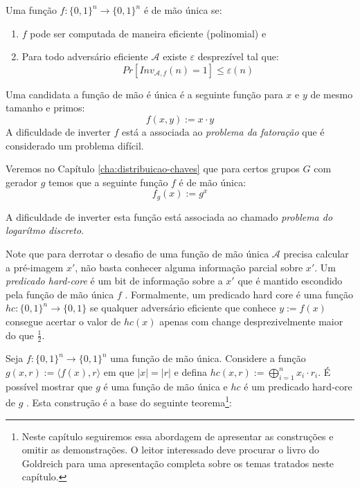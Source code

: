 Uma função $f: \{0,1\}^n \to \{0,1\}^n$ é de mão única se:
\begin{enumerate}
\item $f$ pode ser computada de maneira eficiente (polinomial) e
\item Para todo adversário eficiente $\mathcal{A}$ existe $\varepsilon$ desprezível tal que:
\begin{displaymath}
  Pr[Inv_{\mathcal{A}, f}(n) = 1] \leq \varepsilon(n)
\end{displaymath}
\end{enumerate}


\begin{example}
  Uma candidata a função de mão é única é a seguinte função para $x$ e $y$ de mesmo tamanho e primos:
  \begin{displaymath}
    f(x,y) := x \cdot y
  \end{displaymath}
  A dificuldade de inverter $f$ está a associada ao {\em problema da fatoração} que é considerado um problema difícil.

  Veremos no Capítulo \ref{cha:distribuicao-chaves} que para certos grupos $G$ com gerador $g$ temos que a seguinte função $f$ é de mão única:
  \begin{displaymath}
    f_g(x) := g^x
  \end{displaymath}

A dificuldade de inverter esta função está associada ao chamado {\em problema do logarítmo discreto}.
\end{example}


Note que para derrotar o desafio de uma função de mão única $\mathcal{A}$ precisa calcular a pré-imagem $x'$, não basta conhecer alguma informação parcial sobre $x'$.
Um {\em predicado hard-core} é um bit de informação sobre a $x'$ que é mantido escondido pela função de mão única $f$ \cite{Blum84}.
Formalmente, um predicado hard core é uma função $hc:\{0,1\}^n \to \{0,1\}$ se qualquer adversário eficiente que conhece $y := f(x)$ consegue acertar o valor de $hc(x)$ apenas com change desprezivelmente maior do que $\frac{1}{2}$.


Seja $f:\{0,1\}^n \to \{0,1\}^n$ uma função de mão única.
Considere a função $g(x,r) := \langle f(x), r \rangle$ em que $|x| = |r|$ e defina $hc(x,r) := \bigoplus_{i=1}^nx_i \cdot r_i$.
É possível mostrar que $g$ é uma função de mão única e $hc$ é um predicado hard-core de $g$ \cite{Goldreich89}.
Esta construção é a base do seguinte teorema\footnote{Neste capítulo seguiremos essa abordagem de apresentar as construções e omitir as demonstrações. O leitor interessado deve procurar o livro do Goldreich \cite{Goldreich07} para uma apresentação completa sobre os temas tratados neste capítulo.}:

